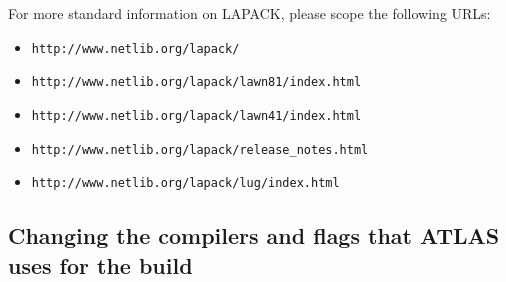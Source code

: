 \documentclass[11pt]{article}
\begin{document}
For more standard information on LAPACK, please scope the following URLs:
\vspace*{-0.1in}
\begin{itemize}
\item \verb|http://www.netlib.org/lapack/|
\vspace*{-0.1in}
\item \verb|http://www.netlib.org/lapack/lawn81/index.html|
\vspace*{-0.1in}
\item \verb|http://www.netlib.org/lapack/lawn41/index.html|
\vspace*{-0.1in}
\item \verb|http://www.netlib.org/lapack/release_notes.html|
\vspace*{-0.1in}
\item \verb|http://www.netlib.org/lapack/lug/index.html|
\end{itemize}


\subsection{Changing the compilers and flags that ATLAS uses for the build}
\label{sec-comps}
\end{document}
